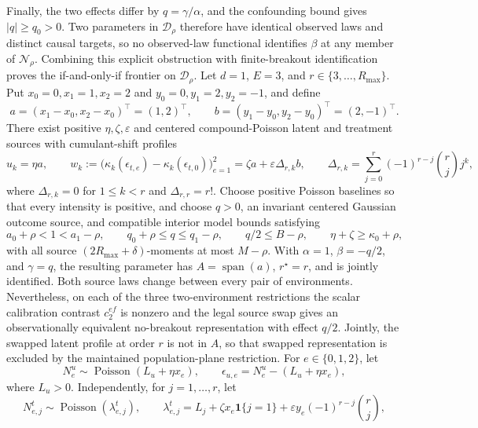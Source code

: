 Finally, the two effects differ by \(q=\gamma/\alpha\), and the confounding bound gives \(|q|\geq q_0>0\).  Two parameters in \(\mathcal D_\rho\) therefore have identical observed laws and distinct causal targets, so no observed-law functional identifies \(\beta\) at any member of \(\mathcal N_\rho\).  Combining this explicit obstruction with finite-breakout identification proves the if-and-only-if frontier on \(\mathcal D_\rho\).
Let \(d=1\), \(E=3\), and \(r\in\{3,\ldots,R_{\max}\}\).  Put \(x_0=0,x_1=1,x_2=2\) and \(y_0=0,y_1=2,y_2=-1\), and define
\[
 a=(x_1-x_0,x_2-x_0)^\top=(1,2)^\top,
 \qquad b=(y_1-y_0,y_2-y_0)^\top=(2,-1)^\top.
\]
There exist positive \(\eta,\zeta,\varepsilon\) and centered compound-Poisson latent and treatment sources with cumulant-shift profiles
\[
 u_k=\eta a,
 \qquad
 w_k:=\bigl(\kappa_k(\epsilon_{t,e})-
                  \kappa_k(\epsilon_{t,0})\bigr)_{e=1}^2
      =\zeta a+\varepsilon\Delta_{r,k}b,
 \qquad
 \Delta_{r,k}=\sum_{j=0}^r(-1)^{r-j}\binom rj j^k,                       \tag{1}
\]
where \(\Delta_{r,k}=0\) for \(1\leq k<r\) and \(\Delta_{r,r}=r!\).  Choose positive Poisson baselines so that every intensity is positive, and choose \(q>0\), an invariant centered Gaussian outcome source, and compatible interior model bounds satisfying
\[
 a_0+\rho<1<a_1-\rho,\qquad
 q_0+\rho\leq q\leq q_1-\rho,\qquad
 q/2\leq B-\rho,\qquad
 \eta+\zeta\geq\kappa_0+\rho,                                           \tag{2}
\]
with all source \((2R_{\max}+\delta)\)-moments at most \(M-\rho\).  With \(\alpha=1\), \(\beta=-q/2\), and \(\gamma=q\), the resulting parameter has \(A=\operatorname{span}(a)\), \(r^\star=r\), and is jointly identified.  Both source laws change between every pair of environments.  Nevertheless, on each of the three two-environment restrictions the scalar calibration contrast \(c_2^{ef}\) is nonzero and the legal source swap gives an observationally equivalent no-breakout representation with effect \(q/2\).  Jointly, the swapped latent profile at order \(r\) is not in \(A\), so that swapped representation is excluded by the maintained population-plane restriction.
For \(e\in\{0,1,2\}\), let
\[
 N^u_e\sim\operatorname{Poisson}(L_u+\eta x_e),
 \qquad
 \epsilon_{u,e}=N^u_e-(L_u+\eta x_e),                                    \tag{3}
\]
where \(L_u>0\).  Independently, for \(j=1,\ldots,r\), let
\[
 N^t_{e,j}\sim\operatorname{Poisson}(\lambda_{e,j}^t),
 \qquad
 \lambda_{e,j}^t
 =L_j+\zeta x_e\mathbf 1\{j=1\}
   +\varepsilon y_e(-1)^{r-j}\binom rj,                                  \tag{4}
\]
